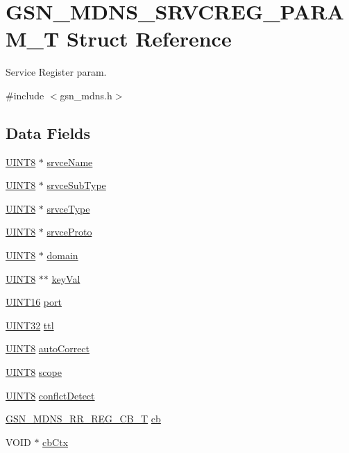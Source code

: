 \hypertarget{a00149}{
\section{GSN\_\-MDNS\_\-SRVCREG\_\-PARAM\_\-T Struct Reference}
\label{a00149}
}


Service Register param.  




{\ttfamily \#include $<$gsn\_\-mdns.h$>$}

\subsection*{Data Fields}
\begin{DoxyCompactItemize}
\item 
\hyperlink{a00660_gab27e9918b538ce9d8ca692479b375b6a}{UINT8} $\ast$ \hyperlink{a00149_a04b7b35934b06d9d838a42dc302525c4}{srvceName}
\item 
\hyperlink{a00660_gab27e9918b538ce9d8ca692479b375b6a}{UINT8} $\ast$ \hyperlink{a00149_a1abfc1470aad0566d2bd0f9566dced35}{srvceSubType}
\item 
\hyperlink{a00660_gab27e9918b538ce9d8ca692479b375b6a}{UINT8} $\ast$ \hyperlink{a00149_ae936821f0b28aba244cd7270eab50b96}{srvceType}
\item 
\hyperlink{a00660_gab27e9918b538ce9d8ca692479b375b6a}{UINT8} $\ast$ \hyperlink{a00149_a9dd2986de2728362170d70c3a10d605c}{srvceProto}
\item 
\hyperlink{a00660_gab27e9918b538ce9d8ca692479b375b6a}{UINT8} $\ast$ \hyperlink{a00149_a3498b70cb998dd924ec4aea5780b9696}{domain}
\item 
\hyperlink{a00660_gab27e9918b538ce9d8ca692479b375b6a}{UINT8} $\ast$$\ast$ \hyperlink{a00149_a7002354a10fbc19991d22a244afd682f}{keyVal}
\item 
\hyperlink{a00660_ga09f1a1fb2293e33483cc8d44aefb1eb1}{UINT16} \hyperlink{a00149_a126a61701dc53e71d74b8e1b50c01ce3}{port}
\item 
\hyperlink{a00660_gae1e6edbbc26d6fbc71a90190d0266018}{UINT32} \hyperlink{a00149_af96204bb13dce2fe8a0dac78b29c40a4}{ttl}
\item 
\hyperlink{a00660_gab27e9918b538ce9d8ca692479b375b6a}{UINT8} \hyperlink{a00149_a6922e2bbd8ef32a53abd5bbf5e2b40a1}{autoCorrect}
\item 
\hyperlink{a00660_gab27e9918b538ce9d8ca692479b375b6a}{UINT8} \hyperlink{a00149_aa73cc4a6cdd8178cc27ecbdd515c750c}{scope}
\item 
\hyperlink{a00660_gab27e9918b538ce9d8ca692479b375b6a}{UINT8} \hyperlink{a00149_af923e50a1240af46d2dedbe9789fb582}{conflctDetect}
\item 
\hyperlink{a00668_ga9c52fae5548745f14ef4e76fb05c2526}{GSN\_\-MDNS\_\-RR\_\-REG\_\-CB\_\-T} \hyperlink{a00149_a9537e3f5198ad7dff4aeecabdc552166}{cb}
\item 
VOID $\ast$ \hyperlink{a00149_abc1717c5357c7dda5c2abef096a06f1f}{cbCtx}
\end{DoxyCompactItemize}


